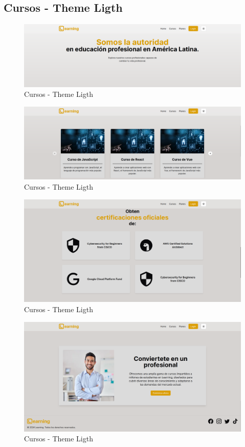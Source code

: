 \subsection{Cursos - Theme Ligth}
  \begin{figure}[H]
    \centering
    \includegraphics[width=1.0\textwidth]{img/C-L1.png}
    \caption{Cursos - Theme Ligth}
  \end{figure}
  \begin{figure}[H]
    \centering
    \includegraphics[width=1.0\textwidth]{img/C-L2.png}
    \caption{Cursos - Theme Ligth}
  \end{figure}
  \begin{figure}[H]
    \centering
    \includegraphics[width=1.0\textwidth]{img/C-L3.png}
    \caption{Cursos - Theme Ligth}
  \end{figure}
  \begin{figure}[H]
    \centering
    \includegraphics[width=1.0\textwidth]{img/C-L4.png}
    \caption{Cursos - Theme Ligth}
  \end{figure}
